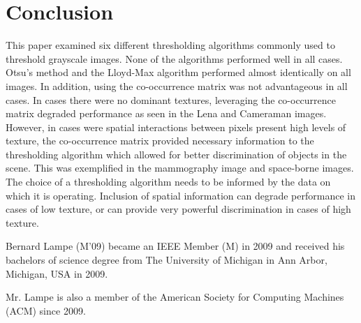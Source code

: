 \documentclass[journal]{IEEEtran}
\begin{document}
\section{Conclusion}
This paper examined six different thresholding algorithms commonly used to threshold grayscale images. None of the algorithms performed well in all cases. Otsu's method and the Lloyd-Max algorithm performed almost identically on all images. In addition, using the co-occurrence matrix was not advantageous in all cases. In cases there were no dominant textures, leveraging the co-occurrence matrix degraded performance as seen in the Lena and Cameraman images. However, in cases were spatial interactions between pixels present high levels of texture, the co-occurrence matrix provided necessary information to the thresholding algorithm which allowed for better discrimination of objects in the scene. This was exemplified in the mammography image and space-borne images. The choice of a thresholding algorithm needs to be informed by the data on which it is operating. Inclusion of spatial information can degrade performance in cases of low texture, or can provide very powerful discrimination in cases of high texture.

\nocite{*}



\begin{IEEEbiographynophoto}{Bernard Lampe}
(M'09) became an IEEE Member (M) in 2009 and received his bachelors of science degree from The University of Michigan in Ann Arbor, Michigan, USA in 2009.
\par Mr. Lampe is also a member of the American Society for Computing Machines (ACM) since 2009.
\end{IEEEbiographynophoto}

\end{document}
